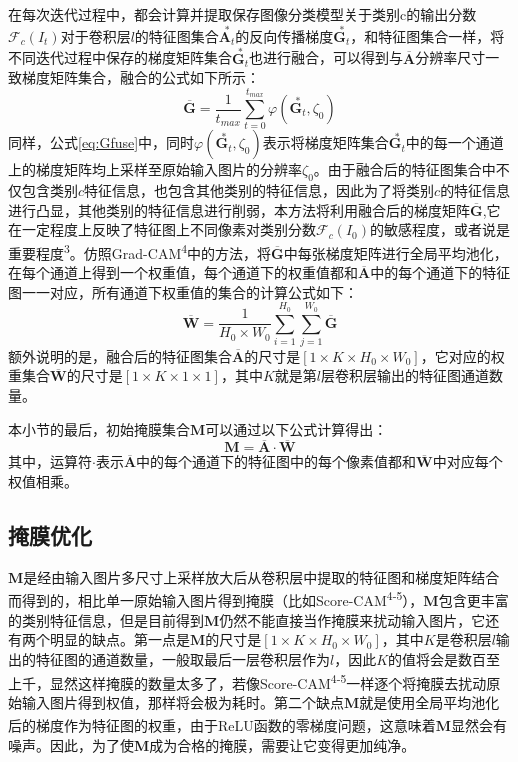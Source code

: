 在每次迭代过程中，都会计算并提取保存图像分类模型关于类别c的输出分数$\mathcal{F}_c(I_t)$对于卷积层$l$的特征图集合$\overset{*}{\boldsymbol{A}_t}$的反向传播梯度$\overset{*}{\boldsymbol{G}_t}$，和特征图集合一样，将不同迭代过程中保存的梯度矩阵集合$\overset{*}{\boldsymbol{G}_t}$也进行融合，可以得到与$\overline{\bm{A}}$分辨率尺寸一致梯度矩阵集合，融合的公式如下所示：
\begin{equation}
	\overline{\bm{G}}=\frac{1}{t_{max}}\sum_{t=0}^{t_{max}}\varphi(\overset{*}{\boldsymbol{G}_t},\zeta_0)
	\label{eq:Gfuse}
\end{equation}
同样，公式\ref{eq:Gfuse}中，同时$\varphi(\overset{*}{\boldsymbol{G}_t},\zeta_0)$表示将梯度矩阵集合$\overset{*}{\boldsymbol{G}_t}$中的每一个通道上的梯度矩阵均上采样至原始输入图片的分辨率$\zeta_0$。由于融合后的特征图集合中不仅包含类别$c$特征信息，也包含其他类别的特征信息，因此为了将类别$c$的特征信息进行凸显，其他类别的特征信息进行削弱，本方法将利用融合后的梯度矩阵$\overline{\bm{G}}$,它在一定程度上反映了特征图上不同像素对类别分数$\mathcal{F}_c(I_0)$的敏感程度，或者说是重要程度\textsuperscript{\cite{selvaraju2017grad}3}。仿照Grad-CAM\textsuperscript{\cite{selvaraju2017grad}4}中的方法，将$\overline{\bm{G}}$中每张梯度矩阵进行全局平均池化，在每个通道上得到一个权重值，每个通道下的权重值都和$\overline{\bm{A}}$中的每个通道下的特征图一一对应，所有通道下权重值的集合的计算公式如下：
\begin{equation}
	\overline{\bm{W}}=\frac{1}{H_0\times W_0}\sum_{i=1}^{H_0}\sum_{j=1}^{W_0}\overline{\bm{G}}
	\label{eq:Wfuse}
\end{equation}
额外说明的是，融合后的特征图集合$\overline{\bm{A}}$的尺寸是$[1\times K \times H_0\times W_0]$，它对应的权重集合$\overline{\bm{W}}$的尺寸是$[1\times K \times 1\times 1]$，其中$K$就是第$l$层卷积层输出的特征图通道数量。

本小节的最后，初始掩膜集合$\boldsymbol{M}$可以通过以下公式计算得出：
\begin{equation}
	\boldsymbol{M}=	\overline{\bm{A}}\cdot\overline{\bm{W}}
\end{equation}
其中，运算符$\cdot$表示$\overline{\bm{A}}$中的每个通道下的特征图中的每个像素值都和$\overline{\boldsymbol{W}}$中对应每个权值相乘。

\subsection{掩膜优化}
$\boldsymbol{M}$是经由输入图片多尺寸上采样放大后从卷积层中提取的特征图和梯度矩阵结合而得到的，相比单一原始输入图片得到掩膜（比如Score-CAM\textsuperscript{\cite{wang2020score}4-5}），$\boldsymbol{M}$包含更丰富的类别特征信息，但是目前得到$\boldsymbol{M}$仍然不能直接当作掩膜来扰动输入图片，它还有两个明显的缺点。第一点是$\boldsymbol{M}$的尺寸是$[1\times K \times H_0\times W_0]$，其中$K$是卷积层$l$输出的特征图的通道数量，一般取最后一层卷积层作为$l$，因此$K$的值将会是数百至上千，显然这样掩膜的数量太多了，若像Score-CAM\textsuperscript{\cite{wang2020score}4-5}一样逐个将掩膜去扰动原始输入图片得到权值，那样将会极为耗时。第二个缺点$\boldsymbol{M}$就是使用全局平均池化后的梯度作为特征图的权重，由于ReLU函数的零梯度问题\textsuperscript{\cite{zhang2021novel}}，这意味着$\boldsymbol{M}$显然会有噪声。因此，为了使$\boldsymbol{M}$成为合格的掩膜，需要让它变得更加纯净。

